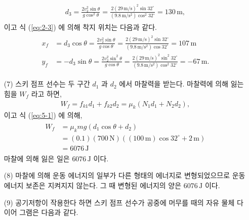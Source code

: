 \documentclass[floatfix,nofootinbib,superscriptaddress,fleqn]{revtex4-2}
\begin{document}
\begin{itemize}
\begin{align}
    \begin{split}
      d_3 = \frac{2v^2_2\sin{\theta}}{g\cos^2{\theta}}
      =\frac{2(29\,\mathrm{m/s})^2\sin{32^\circ}}
      {(9.8\,\mathrm{m/s^2})\cos^2{32^\circ}}
      =130\,\mathrm{m},
    \end{split}
  \end{align} 
  이고 식 (\ref{eq:2-3}) 에 의해 착지 위치는 다음과 같다.
  \begin{align}
    \begin{split}
      x_f &= d_3\cos{\theta}
      =\frac{2v^2_2\sin{\theta}}{g\cos{\theta}}
      =\frac{2(29\,\mathrm{m/s})^2\sin{32^\circ}}
      {(9.8\,\mathrm{m/s^2})\cos{32^\circ}}
      =107\,\mathrm{m} \\
      y_f &= -d_3\sin{\theta}
      =\frac{2v^2_2\sin^2{\theta}}{g\cos{\theta}}
      =\frac{2(29\,\mathrm{m/s})^2\sin^2{32^\circ}}
      {(9.8\,\mathrm{m/s^2})\cos^2{32^\circ}}
      =-67\,\mathrm{m}.
    \end{split}
  \end{align}
  \item[(7)] 스키 점프 선수는 두 구간 $d_1$ 과 $d_2$ 에서 마찰력을 받는다. 
  마찰력에 의해 잃는 힘을 $W_f$ 라고 하면,
  \begin{align}
    W_f = f_{k1}d_1+f_{k2}d_2  = \mu_k(N_1d_1+N_2d_2),
  \end{align}
  이고 식 (\ref{eq:5-1}) 에 의해,
  \begin{align}
    \begin{split}
      W_f &= \mu_kmg(d_1\cos{\theta}+d_2)  \\
      &= (0.1)(700\,\mathrm{N})\left((100\,\mathrm{m})\cos{32^\circ}+2\,\mathrm{m}\right) \\
      &= 6076\,\mathrm{J}
    \end{split}
  \end{align}
  마찰에 의해 잃은 일은 $6076\,\mathrm{J}$ 이다.
  \item[(8)] 마찰에 의해 운동 에너지의 일부가 다른 형태의 에너지로 변형되었으므로 운동 에너지 보존은
   지켜지지 않는다. 그 때 변형된 에너지의 양은 $6076\,\mathrm{J}$ 이다.
  \item[(9)] 공기저항이 작용한다 하면 스키 점프 선수가 공중에 머무를 때의
   자유 물체 다이어 그램은 다음과 같다.
  \begin{figure}[h]
\end{figure}
\end{itemize}
\end{document}
